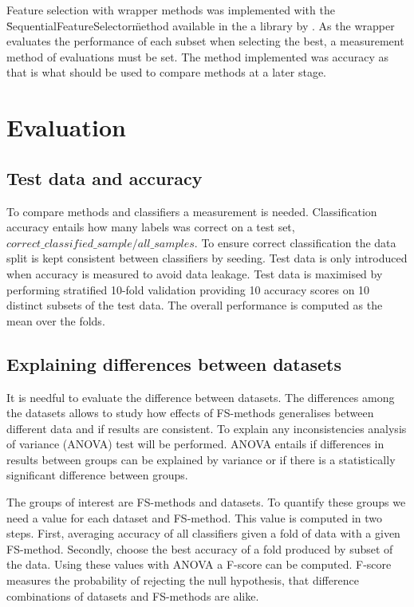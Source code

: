 Feature selection with wrapper methods was implemented with the \"SequentialFeatureSelector\" method available in the a library by \textcite{mlextend}. As the wrapper evaluates the performance of each subset when selecting the best, a measurement method of evaluations must be set. The method implemented was accuracy as that is what should be used to compare methods at a later stage.


\section{Evaluation}
\label{Evaluation}

\subsection{Test data and accuracy}

To compare methods and classifiers a measurement is needed. Classification accuracy entails how many labels was correct on a test set, $correct\_classified\_sample/all\_samples$. To ensure correct classification the data split is kept consistent between classifiers by seeding. Test data is only introduced when accuracy is measured to avoid data leakage. Test data is maximised by performing stratified 10-fold validation providing 10 accuracy scores on 10 distinct subsets of the test data. The overall performance is computed as the mean over the folds.

\subsection{Explaining differences between datasets}

It is needful to evaluate the difference between datasets. The differences among the datasets allows to study how effects of FS-methods generalises between different data and if results are consistent. To explain any inconsistencies analysis of variance (ANOVA) test will be performed. ANOVA entails if differences in results between groups can be explained by variance or if there is a statistically significant difference between groups.

The groups of interest are FS-methods and datasets. To quantify these groups we need a value for each dataset and FS-method. This value is computed in two steps. First, averaging accuracy of all classifiers given a fold of data with a given FS-method. Secondly, choose the best accuracy of a fold produced by subset of the data. Using these values with ANOVA a F-score can be computed. F-score measures the probability of rejecting the null hypothesis, that difference combinations of datasets and FS-methods are alike.

